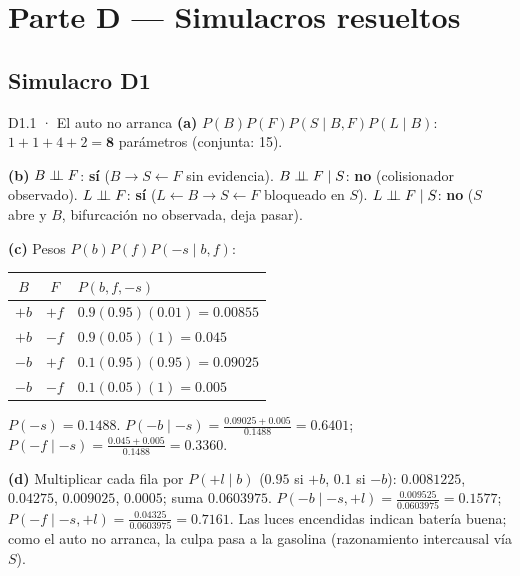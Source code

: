 \newpage
\section{Parte D — Simulacros resueltos}

\subsection*{Simulacro D1}

\begin{solucion}{D1.1 · El auto no arranca}
\textbf{(a)} $P(B)P(F)P(S\mid B,F)P(L\mid B)$: $1+1+4+2=\mathbf8$ parámetros (conjunta: 15).

\textbf{(b)} $B\perp\!\!\!\perp F$: \textbf{sí} ($B\to S\leftarrow F$ sin evidencia). $B\perp\!\!\!\perp F\mid S$: \textbf{no} (colisionador observado).
$L\perp\!\!\!\perp F$: \textbf{sí} ($L\leftarrow B\to S\leftarrow F$ bloqueado en $S$). $L\perp\!\!\!\perp F\mid S$: \textbf{no} ($S$ abre y $B$, bifurcación no observada, deja pasar).

\textbf{(c)} Pesos $P(b)P(f)P(-s\mid b,f)$:
\begin{center}\small
\begin{tabular}{cc|l}
$B$ & $F$ & $P(b,f,-s)$\\\hline
$+b$ & $+f$ & $0.9(0.95)(0.01)=0.00855$\\
$+b$ & $-f$ & $0.9(0.05)(1)=0.045$\\
$-b$ & $+f$ & $0.1(0.95)(0.95)=0.09025$\\
$-b$ & $-f$ & $0.1(0.05)(1)=0.005$
\end{tabular}
\end{center}
$P(-s)=0.1488$. $P(-b\mid-s)=\frac{0.09025+0.005}{0.1488}=\mathbf{0.6401}$; \quad $P(-f\mid-s)=\frac{0.045+0.005}{0.1488}=\mathbf{0.3360}$.

\textbf{(d)} Multiplicar cada fila por $P(+l\mid b)$ ($0.95$ si $+b$, $0.1$ si $-b$): $0.0081225$, $0.04275$, $0.009025$, $0.0005$; suma $0.0603975$.
$P(-b\mid-s,+l)=\frac{0.009525}{0.0603975}=\mathbf{0.1577}$; \quad $P(-f\mid-s,+l)=\frac{0.04325}{0.0603975}=\mathbf{0.7161}$.
Las luces encendidas indican batería buena; como el auto no arranca, la culpa pasa a la gasolina (razonamiento intercausal vía $S$).
\end{solucion}


